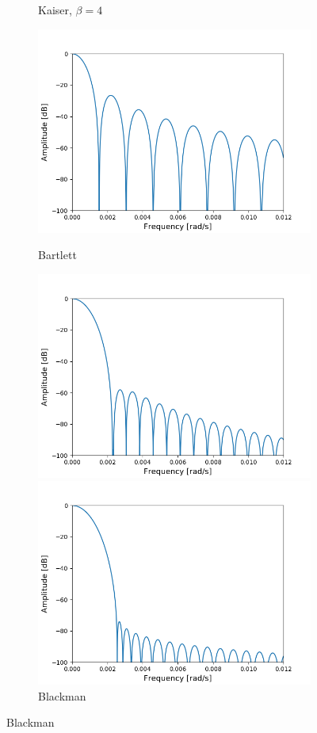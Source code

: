 \begin{figure}[H]
\begin{subfigure}{0.49\textwidth}
\caption{Kaiser, $\beta=4$}
\end{subfigure}
\centering
\begin{subfigure}{0.49\textwidth}
\centering
\includegraphics[width=\textwidth]{figures/dbplots/stft_bilag/8192/bartlett.png}
\caption{Bartlett}
\includegraphics[width=\textwidth]{figures/dbplots/stft_bilag/8192/blackman.png}
\caption{Blackman}
\includegraphics[width=\textwidth]{figures/dbplots/stft_bilag/8192/kaiser10.png}

\end{subfigure}
\end{figure}
